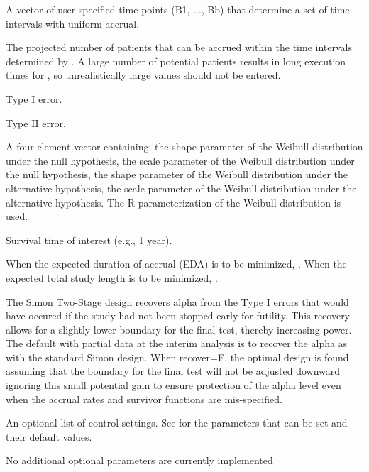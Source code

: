 \begin{Arguments}
\begin{ldescription}
\item[\code{B.init}] A vector of user-specified time points (B1, ..., Bb) that determine a
set of time intervals with uniform accrual.
\item[\code{m.init}] The projected
number of patients that can be accrued within the time intervals
determined by .  A large number of potential patients
results in long execution times for , so
unrealistically large values should not be entered.
\item[\code{alpha}] Type I error.
\item[\code{beta}] Type II error.
\item[\code{param}] A four-element vector containing: the shape parameter of the Weibull distribution under the
null hypothesis, the scale parameter of the Weibull distribution under the
null hypothesis, the shape parameter of the Weibull distribution under the
alternative hypothesis, the scale parameter of the Weibull distribution under the
alternative hypothesis.  The R parameterization of the Weibull
distribution is used.
\item[\code{x}] Survival time of interest (e.g., 1 year).
\item[\code{target}] When the expected duration of
accrual (EDA) is to be minimized, . When the
expected total study length is to be minimized,
.
\item[\code{recover}] The Simon Two-Stage design recovers alpha from the Type I errors
that would have occured if the study had not been stopped early for
futility.  This recovery allows for a slightly lower boundary for the
final test, thereby increasing power.  The default with partial data
at the interim analysis is to recover the alpha as with the standard
Simon design.  When recover=F, the optimal design is found assuming
that the boundary for the final test will not be adjusted downward
ignoring this small potential gain to ensure protection of the alpha
level even when the accrual rates and survivor functions are mis-specified. 

\item[\code{control}] An optional list of control settings.  See
for the parameters that can be set and their default values.
\item[\code{...}] No additional optional parameters are currently implemented
\end{ldescription}
\end{Arguments}
